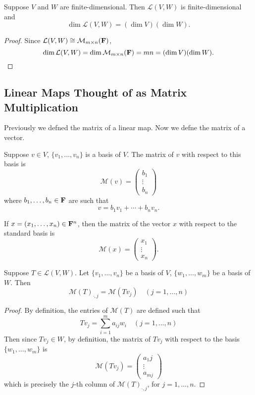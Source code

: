 \begin{corollary}\label{cor:dimension-product}
Suppose $V$ and $W$ are finite-dimensional. Then $\mathcal{L}(V,W)$ is finite-dimensional and
\[\dim\mathcal{L}(V,W)=(\dim V)(\dim W).\]
\end{corollary}

\begin{proof}
Since $\mathcal{L}(V,W)\cong\mathcal{M}_{m\times n}(\mathbf F)$,
\[\dim\mathcal{L}(V,W)=\dim\mathcal{M}_{m\times n}(\mathbf F)=mn=(\dim V)(\dim W).\]
\end{proof}

\subsection{Linear Maps Thought of as Matrix Multiplication}
Previously we defned the matrix of a linear map. Now we defne the matrix of a vector.

\begin{definition}
Suppose $v\in V$, $\{v_1,\dots,v_n\}$ is a basis of $V$. The matrix of $v$ with respect to this basis is
\[\mathcal{M}(v)=\begin{pmatrix}
b_1\\\vdots\\b_n
\end{pmatrix}\]
where $b_1,\dots,b_n\in\mathbf F$ are such that
\[v=b_1v_1+\cdots+b_nv_n.\]
\end{definition}

\begin{example}
If $x=(x_1,\dots,x_n)\in\mathbf F^n$, then the matrix of the vector $x$ with respect to the standard basis is
\[\mathcal{M}(x)=\begin{pmatrix}
x_1\\\vdots\\x_n
\end{pmatrix}.\]
\end{example}

\begin{proposition}
Suppose $T\in\mathcal{L}(V,W)$. Let $\{v_1,\dots,v_n\}$ be a basis of $V$, $\{w_1,\dots,w_m\}$ be a basis of $W$. Then
\[\mathcal{M}(T)_{\cdot,j}=\mathcal{M}(Tv_j)\quad(j=1,\dots,n)\]
\end{proposition}

\begin{proof}
By definition, the entries of $\mathcal{M}(T)$ are defined such that
\[Tv_j=\sum_{i=1}^{m}a_{ij}w_i\quad(j=1,\dots,n)\]
Then since $Tv_j\in W$, by definition, the matrix of $Tv_j$ with respect to the basis $\{w_1,\dots,w_m\}$ is
\[\mathcal{M}(Tv_j)=\begin{pmatrix}
a_1j\\\vdots\\a_{mj}
\end{pmatrix}\]
which is precisely the $j$-th column of $\mathcal{M}(T)_{\cdot,j}$, for $j=1,\dots,n$.
\end{proof}


